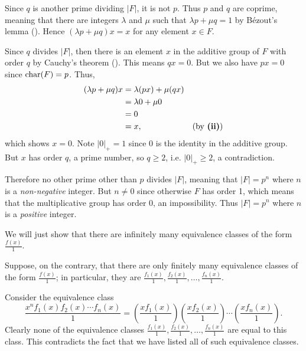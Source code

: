 \begin{questions}
\begin{partquestions}{\roman*}
        \item Since $q$ is another prime dividing $|F|$, it is not $p$. Thus $p$ and $q$ are coprime, meaning that there are integers $\lambda$ and $\mu$ such that $\lambda p + \mu q = 1$ by B\'ezout's lemma (). Hence $(\lambda p + \mu q)x = x$ for any element $x \in F$.

        \item Since $q$ divides $|F|$, then there is an element $x$ in the additive group of $F$ with order $q$ by Cauchy's theorem (). This means $qx = 0$. But we also have $px = 0$ since $\mathrm{char}(F) = p$. Thus,
        \begin{align*}
            (\lambda p + \mu q)x &= \lambda (px) + \mu (qx) \\
            &= \lambda 0 + \mu 0\\
            &= 0\\
            &= x, & (\text{by \textbf{(ii)}})
        \end{align*}
        which shows $x = 0$. Note $|0|_+ = 1$ since 0 is the identity in the additive group. But $x$ has order $q$, a prime number, so $q \geq 2$, i.e. $|0|_+ \geq 2$, a contradiction.

        Therefore no other prime other than $p$ divides $|F|$, meaning that $|F| = p^n$ where $n$ is a \textit{non-negative} integer. But $n \neq 0$ since otherwise $F$ has order 1, which means that the multiplicative group has order 0, an impossibility. Thus $|F| = p^n$ where $n$ is a \textit{positive} integer.
    \end{partquestions}

    \item \begin{partquestions}{\alph*}
        \item We will just show that there are infinitely many equivalence classes of the form $\frac{f(x)}1$.

        Suppose, on the contrary, that there are only finitely many equivalence classes of the form $\frac{f(x)}1$; in particular, they are $\frac{f_1(x)}1, \frac{f_2(x)}1, \dots, \frac{f_n(x)}1$.

        Consider the equivalence class
        \[
            \frac{x^nf_1(x)f_2(x)\cdots f_n(x)}{1} = \left(\frac{xf_1(x)}{1}\right)\left(\frac{xf_2(x)}{1}\right)\cdots\left(\frac{xf_n(x)}{1}\right).
        \]
        Clearly none of the equivalence classes $\frac{f_1(x)}1, \frac{f_2(x)}1, \dots, \frac{f_n(x)}1$ are equal to this class. This contradicts the fact that we have listed all of such equivalence classes.


\end{partquestions}
\end{questions}
